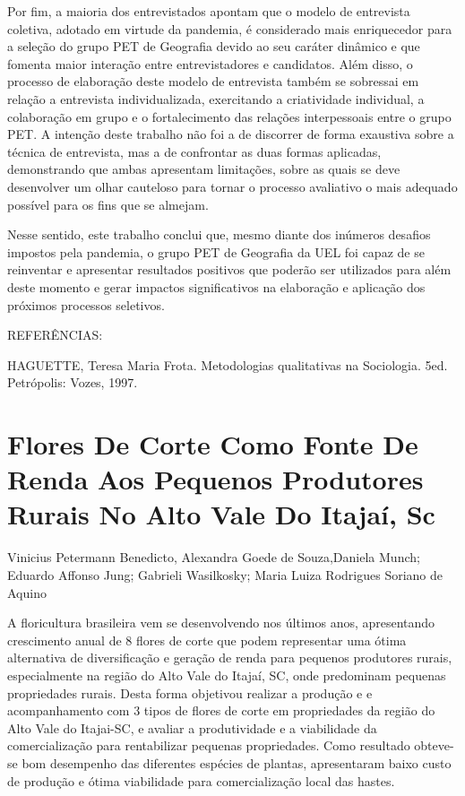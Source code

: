Por fim, a maioria dos entrevistados apontam que o modelo de entrevista coletiva, adotado em virtude da pandemia, é considerado mais enriquecedor para a seleção do grupo PET de Geografia devido ao seu caráter dinâmico e que fomenta maior interação entre entrevistadores e candidatos. Além disso, o processo de elaboração deste modelo de entrevista também se sobressai em relação a entrevista individualizada, exercitando a criatividade individual, a colaboração em grupo e o fortalecimento das relações interpessoais entre o grupo PET. A intenção deste trabalho não foi a de discorrer de forma exaustiva sobre a técnica de entrevista, mas a de confrontar as duas formas aplicadas, demonstrando que ambas apresentam limitações, sobre as quais se deve desenvolver um olhar cauteloso para tornar o processo avaliativo o mais adequado possível para os fins que se almejam.

Nesse sentido, este trabalho conclui que, mesmo diante dos inúmeros desafios impostos pela pandemia, o grupo PET de Geografia da UEL foi capaz de se reinventar e apresentar resultados positivos que poderão ser utilizados para além deste momento e gerar impactos significativos na elaboração e aplicação dos próximos processos seletivos.

REFERÊNCIAS:

HAGUETTE, Teresa Maria Frota. Metodologias qualitativas na Sociologia. 5ed. Petrópolis: Vozes, 1997.




\section*{Flores De Corte Como Fonte De Renda Aos Pequenos Produtores Rurais No Alto Vale Do Itajaí, Sc}

Vinicius Petermann Benedicto, Alexandra Goede de Souza,Daniela Munch; Eduardo Affonso Jung;  Gabrieli Wasilkosky; Maria Luiza Rodrigues Soriano de Aquino

A floricultura brasileira vem se desenvolvendo nos últimos anos, apresentando crescimento anual de 8%
 flores de corte que podem representar uma ótima alternativa de diversificação e geração de renda para pequenos produtores rurais, especialmente na região do Alto Vale do Itajaí, SC, onde predominam pequenas propriedades rurais. Desta forma objetivou realizar a produção e e acompanhamento com 3 tipos de flores de corte em propriedades da região do Alto Vale do Itajai-SC, e avaliar a produtividade e a viabilidade da comercialização para rentabilizar pequenas propriedades. Como resultado obteve-se bom desempenho das diferentes espécies de plantas, apresentaram baixo custo de produção e ótima viabilidade para comercialização local das hastes.

